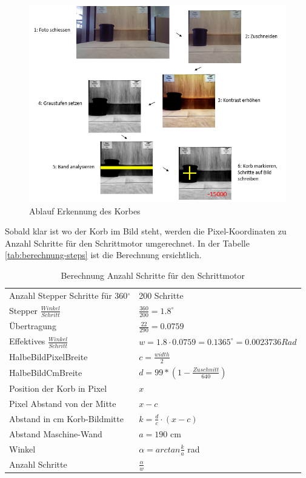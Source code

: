 \begin{figure}[h!]
	\centering
	\includegraphics[width=0.8\linewidth]{../../fig/algorithmus-korb-erkennung.png}
	\caption{Ablauf Erkennung des Korbes}
	\label{fig:ablauf-ortung-des-korbes-algorithmus}
\end{figure}

\newpage
Sobald klar ist wo der Korb im Bild steht, werden die Pixel-Koordinaten zu Anzahl Schritte für den Schrittmotor umgerechnet. In der Tabelle \ref{tab:berechnung-steps} ist die Berechnung ersichtlich. 

\label{tab:berechnung-steps}
\begin{table}[h!]
	\renewcommand{\arraystretch}{1.5}
	\centering
	\begin{tabular}{l l}
		Anzahl Stepper Schritte für 360$^\circ$ & 200 Schritte \\
		Stepper $\frac{Winkel}{Schritt}$ & $\frac{360}{200} = 1.8^\circ$ \\
		Übertragung & $\frac{22}{290} = 0.0759$ \\
		Effektives $\frac{Winkel}{Schritt}$ & $w = 1.8 \cdot 0.0759 = 0.1365^\circ = 0.0023736 Rad$ \\
		HalbeBildPixelBreite & $c = \frac{width}{2}$ \\
		HalbeBildCmBreite & $d = 99*(1-\frac{Zuschnitt}{640})$ \\
		Position der Korb in Pixel & $x$ \\
		Pixel Abstand von der Mitte & $x - c$ \\
		Abstand in cm Korb-Bildmitte & $k = \frac{d}{c} \cdot (x-c)$ \\
		Abstand Maschine-Wand & $a = 190$ cm \\
		Winkel & $\alpha = arctan\frac{k}{a}$ rad \\
		Anzahl Schritte & $\frac{\alpha}{w}$ \\
	\end{tabular}
	\caption{Berechnung Anzahl Schritte für den Schrittmotor}
\end{table}

